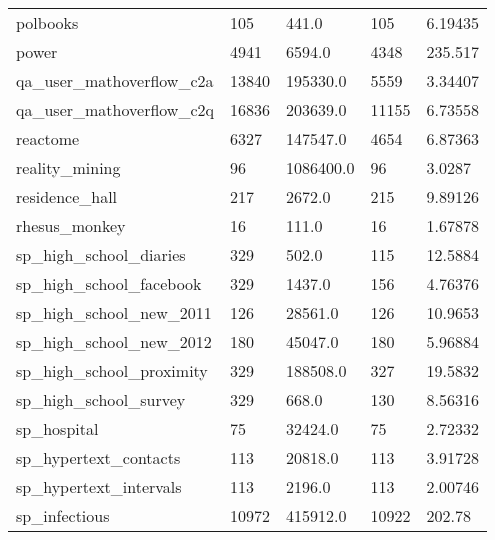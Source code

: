 \begin{longtable}{lllll}
 polbooks                                           & 105        & 441.0       & 105   & 6.19435    \\
 power                                              & 4941       & 6594.0      & 4348  & 235.517    \\
 qa\_user\_mathoverflow\_c2a                           & 13840      & 195330.0    & 5559  & 3.34407    \\
 qa\_user\_mathoverflow\_c2q                           & 16836      & 203639.0    & 11155 & 6.73558    \\
 reactome                                           & 6327       & 147547.0    & 4654  & 6.87363    \\
 reality\_mining                                     & 96         & 1086400.0   & 96    & 3.0287     \\
 residence\_hall                                     & 217        & 2672.0      & 215   & 9.89126    \\
 rhesus\_monkey                                      & 16         & 111.0       & 16    & 1.67878    \\
 sp\_high\_school\_diaries                             & 329        & 502.0       & 115   & 12.5884    \\
 sp\_high\_school\_facebook                            & 329        & 1437.0      & 156   & 4.76376    \\
 sp\_high\_school\_new\_2011                            & 126        & 28561.0     & 126   & 10.9653    \\
 sp\_high\_school\_new\_2012                            & 180        & 45047.0     & 180   & 5.96884    \\
 sp\_high\_school\_proximity                           & 329        & 188508.0    & 327   & 19.5832    \\
 sp\_high\_school\_survey                              & 329        & 668.0       & 130   & 8.56316    \\
 sp\_hospital                                        & 75         & 32424.0     & 75    & 2.72332    \\
 sp\_hypertext\_contacts                              & 113        & 20818.0     & 113   & 3.91728    \\
 sp\_hypertext\_intervals                             & 113        & 2196.0      & 113   & 2.00746    \\
 sp\_infectious                                      & 10972      & 415912.0    & 10922 & 202.78     \\

\end{longtable}
